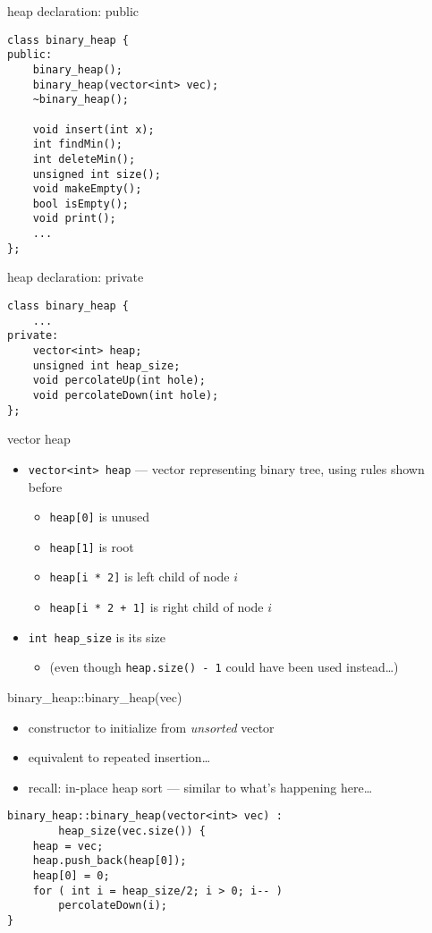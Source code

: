 \begin{frame}[fragile,label=heapPublic]{heap declaration: public}
\lstset{language=C++,style=small}
\begin{lstlisting}
class binary_heap {
public:
    binary_heap();
    binary_heap(vector<int> vec);
    ~binary_heap();
    
    void insert(int x);
    int findMin();
    int deleteMin();
    unsigned int size();
    void makeEmpty();
    bool isEmpty();
    void print();
    ...
};
\end{lstlisting}
\end{frame}

\begin{frame}[fragile,label=heapPrivate]{heap declaration: private}
\lstset{language=C++,style=small}
\begin{lstlisting}
class binary_heap {
    ...
private:
    vector<int> heap;
    unsigned int heap_size;
    void percolateUp(int hole);
    void percolateDown(int hole);
};
\end{lstlisting}
\end{frame}

\begin{frame}[fragile,label=vectorHeap]{vector heap}
\lstset{language=C++,style=small}
\begin{itemize}
\item \lstinline|vector<int> heap| --- vector representing binary tree, using rules shown before
\begin{itemize}
\item \lstinline|heap[0]| is unused
\item \lstinline|heap[1]| is root
\item \lstinline|heap[i * 2]| is left child of node $i$
\item \lstinline|heap[i * 2 + 1]| is right child of node $i$
\end{itemize}
\item \lstinline|int heap_size| is its size 
\begin{itemize}
\item (even though \texttt{heap.size() - 1} could have been used instead\ldots)
\end{itemize}
\end{itemize}
\end{frame}

\begin{frame}[fragile,label=constructFromHeap]{binary\_heap::binary\_heap(vec)} 
\lstset{language=C++,style=small}
\begin{itemize}
\item constructor to initialize from \textit{unsorted} vector
\item equivalent to repeated insertion\ldots
\item<2-> recall: in-place heap sort --- similar to what's happening here\ldots
\end{itemize}
\begin{lstlisting}
binary_heap::binary_heap(vector<int> vec) : 
        heap_size(vec.size()) {
    heap = vec;
    heap.push_back(heap[0]);
    heap[0] = 0;
    for ( int i = heap_size/2; i > 0; i-- )
        percolateDown(i);
}
\end{lstlisting}
\end{frame}

